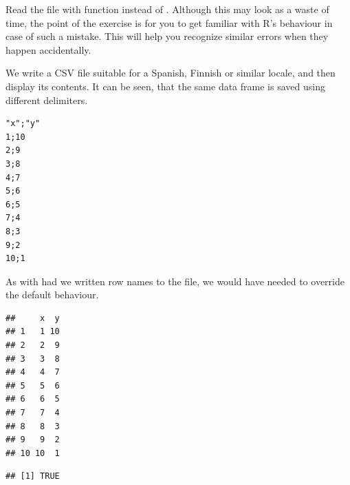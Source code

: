 \documentclass[krantz2,ChapterTOCs]{krantz}\usepackage{knitr}
\begin{document}
\begin{playground}
Read the file with function  instead of . Although this may look as a waste of time, the point of the exercise is for you to get familiar with R's behaviour in case of such a mistake. This will help you recognize similar errors when they happen accidentally.
\end{playground}

We write a CSV file suitable for a Spanish, Finnish or similar locale, and then display its contents. It can be seen, that the same data frame is saved using different delimiters.
\begin{knitrout}\footnotesize
{}\color{fgcolor}\begin{kframe}
\begin{alltt}
  \hlstd{=} \hlstd{,}  \hlstd{=} \hlstd{)}
\hlstd{(}\hlstd{,}  \hlstd{=} \hlstd{)}
\end{alltt}
\end{kframe}
\end{knitrout}

\begin{knitrout}\footnotesize
{}\color{fgcolor}\begin{kframe}
\begin{verbatim}
"x";"y"
1;10
2;9
3;8
4;7
5;6
6;5
7;4
8;3
9;2
10;1
\end{verbatim}
\end{kframe}
\end{knitrout}

As with  had we written row names to the file, we would have needed to override the default behaviour.
\begin{knitrout}\footnotesize
{}\color{fgcolor}\begin{kframe}
\begin{alltt}
 \hlkwb{<-} \hlstd{(} \hlstd{=} \hlstd{)}
\end{alltt}
\begin{verbatim}
##     x  y
## 1   1 10
## 2   2  9
## 3   3  8
## 4   4  7
## 5   5  6
## 6   6  5
## 7   7  4
## 8   8  3
## 9   9  2
## 10 10  1
\end{verbatim}
\begin{alltt}
  \hlstd{=} \hlstd{)}
\end{alltt}
\begin{verbatim}
## [1] TRUE
\end{verbatim}
\end{kframe}
\end{knitrout}
\end{document}
